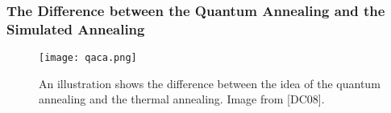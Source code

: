 \documentclass{beamer}
\begin{document}

\begin{frame}
	\frametitle{The Difference between the Quantum Annealing and the Simulated Annealing}
	\begin{figure}[h]
		\centering
		\texttt{[image: qaca.png]}
		\caption{An illustration shows the difference between the idea of the quantum annealing and the thermal annealing. Image from [DC08]\footnotemark[1]. }
		\label{diff_qa_ca}
	\end{figure}
\end{frame}
\end{document}
